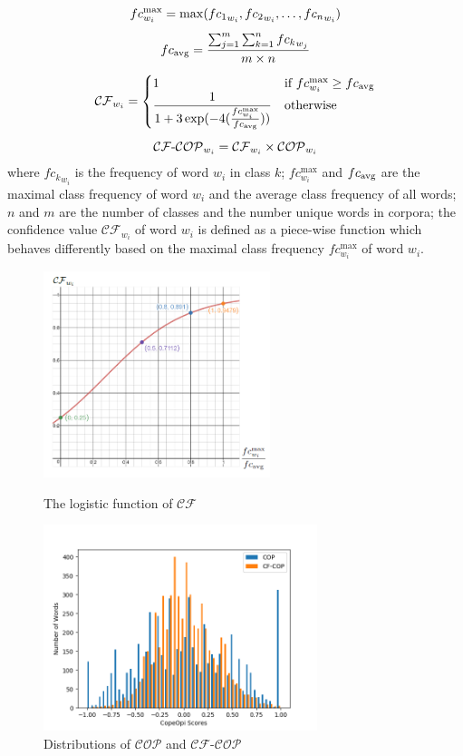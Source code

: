 \begin{equation*}
\begin{gathered}
	fc^{\max}_{w_i} = \max({fc_1}_{w_i},{fc_2}_{w_i},\dots,{fc_n}_{w_i})
\\[\eqlineskip]
	fc_{\avg} = \dfrac {
		\sum_{j=1}^m \sum_{k=1}^n {fc_k}_{w_j}
	}{
		m \times n
	}
\\[\eqlineskip]
	\mathcal{CF}_{w_i} =
	\begin{cases}
		1
		&\text{if $fc^{\max}_{w_i} \geq fc_{\avg}$}
	\\
		\dfrac{1}{1 + 3 \exp(-4(\frac{fc^{\max}_{w_i}}{fc_{\avg}}))}
		&\text{otherwise}
	\end{cases}
\\[\eqlineskip]
	\mathcal{CF}\text{-}\mathcal{COP}_{w_i} = \mathcal{CF}_{w_i} \times \mathcal{COP}_{w_i}
\end{gathered}
\end{equation*}
where ${fc_k}_{w_i}$ is the frequency of word $w_i$ in class $k$;
$fc^{\max}_{w_i}$ and $fc_{\operatorname{avg}}$ are the maximal class frequency of word $w_i$ and the average class frequency of all words;
$n$ and $m$ are the number of classes and the number unique words in corpora;
the confidence value $\mathcal{CF}_{w_i}$ of word $w_i$ is defined as a piece-wise function which behaves differently based on the maximal class frequency $fc^{\max}_{w_i}$ of word $w_i$.
\begin{figure}[t]
\begin{minipage}{0.5\textwidth}
	\centering
	\includegraphics[height=6cm]{chapters/ch3/figure/conf.png}
	\caption{The logistic function of $\mathcal{CF}$}
\end{minipage}
\begin{minipage}{0.5\textwidth}
	\centering
	\includegraphics[height=6cm]{chapters/ch3/figure/conf_ex.png}
	\caption{Distributions of $\mathcal{COP}$ and $\mathcal{CF}\text{-}\mathcal{COP}$}
\end{minipage}
\end{figure}

